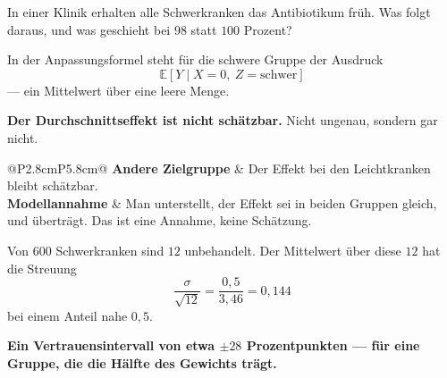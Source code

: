 \begin{aufgabe}
In einer Klinik erhalten alle Schwerkranken das Antibiotikum früh. Was folgt daraus, und was geschieht bei $98$ statt $100$ Prozent?

\loesung
{}
In der Anpassungsformel steht für die schwere Gruppe der Ausdruck
\[ \mathbb{E}[Y \mid X=0,\ Z=\text{schwer}] \]
--- ein Mittelwert über eine leere Menge.

\begin{center}
\begin{minipage}{0.9\textwidth}
\textbf{Der Durchschnittseffekt ist nicht schätzbar.} Nicht ungenau, sondern gar nicht.
\end{minipage}
\end{center}

\begin{center}
{\small
\renewcommand{\arraystretch}{1.5}
\begin{tabular}{@{}P{2.8cm}P{5.8cm}@{}}
\toprule
\textbf{Andere Zielgruppe} & Der Effekt bei den Leichtkranken bleibt schätzbar.\\
\textbf{Modellannahme} & Man unterstellt, der Effekt sei in beiden Gruppen gleich, und überträgt. Das ist eine Annahme, keine Schätzung.\\
\bottomrule
\end{tabular}}
\end{center}

Von $600$ Schwerkranken sind $12$ unbehandelt. Der Mittelwert über diese $12$ hat die Streuung
\[ \frac{\sigma}{\sqrt{12}} = \frac{0{,}5}{3{,}46} = 0{,}144 \]
bei einem Anteil nahe $0{,}5$.

\begin{center}
\begin{minipage}{0.9\textwidth}
\textbf{Ein Vertrauensintervall von etwa $\pm28$ Prozentpunkten --- für eine Gruppe, die die Hälfte des Gewichts trägt.}
\end{minipage}
\end{center}

\begin{center}
\begin{minipage}{0.88\textwidth}
\end{minipage}
\end{center}


\end{aufgabe}
